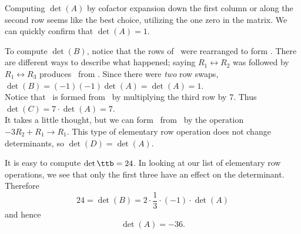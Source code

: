 {
Computing $\det(A)$ by cofactor expansion down the first column or along the second row seems like the best choice, utilizing the one zero in the matrix. We can quickly confirm that $\det(A) = 1$. 

To compute $\det(B)$, notice that the rows of \tta\ were rearranged to form \ttb. There are different ways to describe what happened; saying $R_1\leftrightarrow R_2$ was followed by $R_1\leftrightarrow R_3$ produces \ttb\ from \tta. Since there were \textit{two} row swaps, $\det(B) = (-1)(-1)\det(A) = \det(A) = 1$.\\ 

Notice that \ttc\ is formed from \tta\ by multiplying the third row by 7. Thus $\det(C) = 7\cdot\det(A) = 7$.\\

It takes a little thought, but we can form \ttd\ from \tta\ by the operation $-3R_2+R_1\rightarrow R_1$. This type of elementary row operation does not change determinants, so $\det(D) = \det(A)$.
} 

\pagebreak

{
It is easy to compute $\det\ttb=24$. In looking at our list of elementary row operations, we see that only the first three have an effect on the determinant. Therefore 
\[
24 = \det(B) = 2\cdot \frac13  \cdot (-1)\cdot \det(A)
\]
and hence 
\[
\det(A) = -36.
\]
} 

